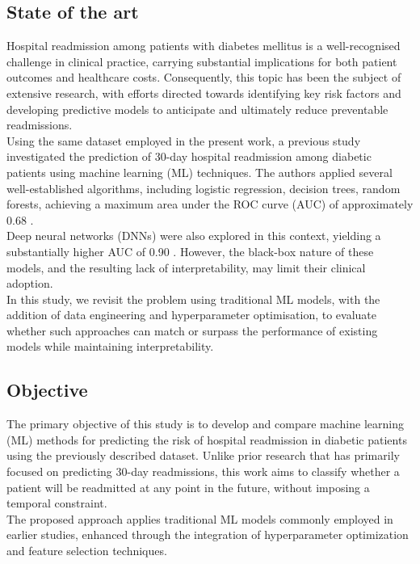 \subsection{State of the art}
Hospital readmission among patients with diabetes mellitus is a well-recognised challenge in clinical practice, carrying substantial implications for both patient outcomes and healthcare costs. Consequently, this topic has been the subject of extensive research, with efforts directed towards identifying key risk factors and developing predictive models to anticipate and ultimately reduce preventable readmissions.\\
Using the same dataset employed in the present work, a previous study investigated the prediction of 30-day hospital readmission among diabetic patients using machine learning (ML) techniques. The authors applied several well-established algorithms, including logistic regression, decision trees, random forests, achieving a maximum area under the ROC curve (AUC) of approximately 0.68 \cite{shang202130}.\\
Deep neural networks (DNNs) were also explored in this context, yielding a substantially higher AUC of 0.90 \cite{hammoudeh2018predicting}. However, the black-box nature of these models, and the resulting lack of interpretability, may limit their clinical adoption.\\
In this study, we revisit the problem using traditional ML models, with the addition of data engineering and hyperparameter optimisation, to evaluate whether such approaches can match or surpass the performance of existing models while maintaining interpretability.


\subsection{Objective}
The primary objective of this study is to develop and compare machine learning (ML) methods for predicting the risk of hospital readmission in diabetic patients using the previously described dataset. Unlike prior research that has primarily focused on predicting 30-day readmissions, this work aims to classify whether a patient will be readmitted at any point in the future, without imposing a temporal constraint.\\
The proposed approach applies traditional ML models commonly employed in earlier studies, enhanced through the integration of hyperparameter optimization and feature selection techniques.



